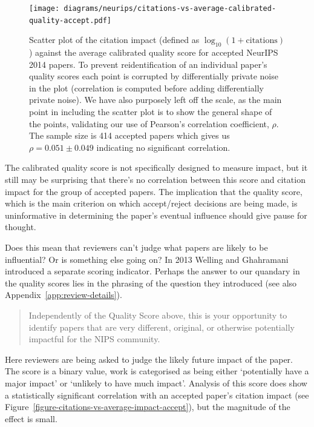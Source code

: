 \documentclass[twoside]{article}
\begin{document}
\begin{figure}[htb]
  \begin{center}
    \texttt{[image: diagrams/neurips/citations-vs-average-calibrated-quality-accept.pdf]}
  \end{center}
  \caption{Scatter plot of the citation impact (defined as
    $\log_{10}(1+\text{citations})$) against the average calibrated
    quality score for accepted NeurIPS 2014 papers. To prevent
    reidentification of an individual paper's quality scores each
    point is corrupted by differentially private noise in the plot
    (correlation is computed before adding differentially private
    noise). We have also purposely left off the scale, as the main
    point in including the scatter plot is to show the general shape
    of the points, validating our use of Pearson's correlation
    coefficient, $\rho$. The sample size is 414 accepted papers which
    gives us $\rho = 0.051 \pm 0.049$ indicating no significant
    correlation.}
  \label{figure-citations-vs-average-calibrated-quality-accept}
\end{figure}

The calibrated quality score is not specifically designed to measure
impact, but it still may be surprising that there's no correlation
between this score and citation impact for the group of accepted
papers. The implication that the quality score, which is the main
criterion on which accept/reject decisions are being made, is
uninformative in determining the paper's eventual influence should
give pause for thought.

Does this mean that reviewers can't judge what papers are likely to be
influential? Or is something else going on? In 2013 Welling and
Ghahramani introduced a separate scoring indicator. 
Perhaps the answer to our quandary in the quality
scores lies in the phrasing of the question they introduced (see also
Appendix~\ref{app:review-details}).
\begin{quote}
  Independently of the Quality Score above, this is your opportunity to
identify papers that are very different, original, or otherwise
potentially impactful for the NIPS community.
\end{quote}

Here reviewers are being asked to judge the likely future impact of
the paper. The score is a binary value, work is categorised as being
either `potentially have a major impact' or `unlikely to have much
impact'. Analysis of this score does show a statistically significant
correlation with an accepted paper's citation impact (see Figure~\ref{figure-citations-vs-average-impact-accept}), but the magnitude of
the effect is small.
\end{document}
